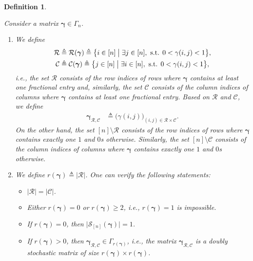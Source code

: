 \documentclass[journal,lettersize,twocolumn]{IEEEtran} %
\newtheorem{definition}[theorem]{Definition}
\newcommand{\vect}[1]{ \bm{#1} }
\newcommand{\set}[1]{\mathcal{#1}}
\newcommand{\vgam}{ \vect{\gamma} }
\newcommand{\defeq}{ \triangleq }
\newcommand{\setC}{\set{C}}
\newcommand{\setR}{\set{R}}
\newcommand{\setS}{\set{S}}
\newcommand{\vgamRCp}{\vgam_{\setR,\setC}}
\newcommand{\ie}{\textit{i.e.}}
\begin{document}
\begin{definition}    
  \label{sec:1:def:10:part:2}
  \label{sec:1:def:15}

  Consider a matrix $ \vgam \in \Gamma_n $.
  \begin{enumerate}
    
  \item We define
    \begin{align*}
      \setR 
        &\defeq 
           \setR(\vgam)
         \defeq 
           \bigl\{ 
             i \in [n] 
           \bigm|
             \exists j\in [n], \text{ s.t. } 0 < \gamma(i,j) < 1 
           \bigr\}, \\
      \setC
        &\defeq 
           \setC(\vgam)
         \defeq
           \bigl\{ 
             j \in [n]
           \bigm|
             \exists i \in [n], \text{ s.t. } 0 < \gamma(i,j) < 1
           \bigr\},
    \end{align*}
    \ie, the set $\setR$ consists of the row indices of rows where $\vgam$
    contains at least one fractional entry and, similarly, the set $\setC$
    consists of the column indices of columns where $\vgam$ contains at least
    one fractional entry. Based on $\setR$ and $\setC$, we define
    \begin{align*}
      \vgamRCp 
        &\defeq 
           \bigl( \gamma(i,j) \bigr)_{(i,j) \in \setR \times \setC}.
    \end{align*}
    On the other hand, the set $[n] \setminus \setR$ consists of the row
    indices of rows where $\vgam$ contains exactly one $1$ and $0$s
    otherwise. Similarly, the set $[n] \setminus \setC$ consists of the
    column indices of columns where $\vgam$ contains exactly one $1$ and $0$s
    otherwise.
  
  \item We define $ r(\vgam) \defeq |\setR|$. One can verify the
    following statements:
    \begin{itemize}

    \item $|\setR| = |\setC|$.

    \item Either $r(\vgam) = 0$ or $r(\vgam) \geq 2$, \ie,
      $r(\vgam) = 1$ is impossible.

    \item If $r(\vgam) = 0$, then
      $\bigl| \setS_{[n]}(\vgam) \bigr| = 1$.

    \item If $r(\vgam) > 0$, then $\vgamRCp \in \Gamma_{r(\vgam)}$, \ie, the
      matrix $\vgamRCp$ is a doubly stochastic matrix of size
      $r(\vgam) \times r(\vgam)$.


\end{itemize}
\end{enumerate}
\end{definition}
\end{document}
